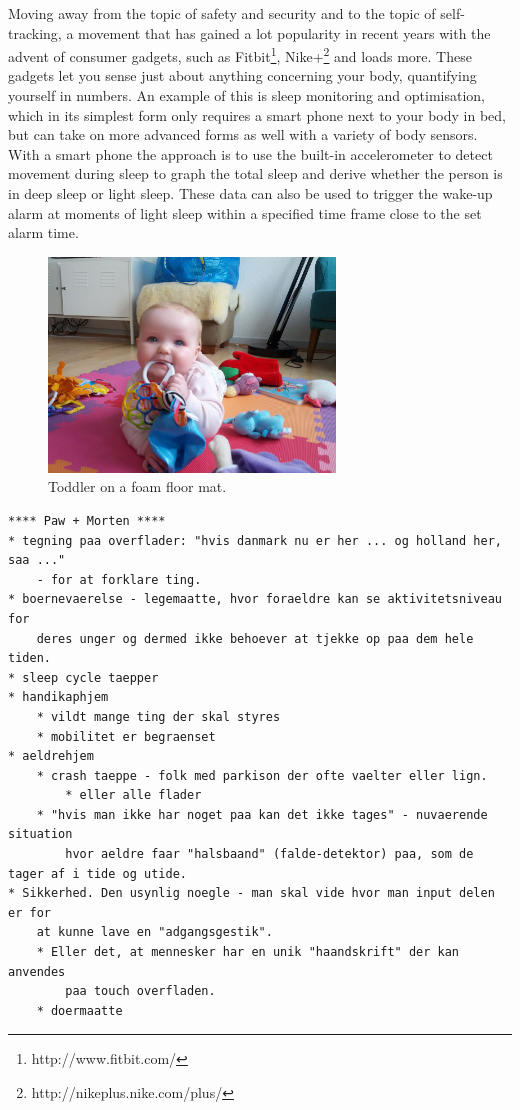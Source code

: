 
Moving away from the topic of safety and security and to the topic of self-tracking, a movement that has gained a lot popularity in recent years with the advent of consumer gadgets, such as Fitbit\footnote{http://www.fitbit.com/}, Nike+\footnote{http://nikeplus.nike.com/plus/} and loads more. 
These gadgets let you sense just about anything concerning your body, quantifying yourself in numbers.
An example of this is sleep monitoring and optimisation, which in its simplest form only requires a smart phone next to your body in bed, but can take on more advanced forms as well with a variety of body sensors.
With a smart phone the approach is to use the built-in accelerometer to detect movement during sleep to graph the total sleep and derive whether the person is in deep sleep or light sleep.
These data can also be used to trigger the wake-up alarm at moments of light sleep within a specified time frame close to the set alarm time.


\begin{figure}[h]
  \centering
      \includegraphics[width=3in]{figures/touch/evaluation/softtiles}
  \caption[Toddler on a foam floor mat with puzzle-like tiles for extensibility.]
  {Toddler on a foam floor mat.}
  \label{fig:textiletouch:eval:softtiles}
\end{figure}

\begin{verbatim}
**** Paw + Morten ****
* tegning paa overflader: "hvis danmark nu er her ... og holland her, saa ..." 
	- for at forklare ting.
* boernevaerelse - legemaatte, hvor foraeldre kan se aktivitetsniveau for 
	deres unger og dermed ikke behoever at tjekke op paa dem hele tiden.
* sleep cycle taepper
* handikaphjem
	* vildt mange ting der skal styres
    * mobilitet er begraenset
* aeldrehjem
    * crash taeppe - folk med parkison der ofte vaelter eller lign.
        * eller alle flader
    * "hvis man ikke har noget paa kan det ikke tages" - nuvaerende situation 
		hvor aeldre faar "halsbaand" (falde-detektor) paa, som de tager af i tide og utide.
* Sikkerhed. Den usynlig noegle - man skal vide hvor man input delen er for 
	at kunne lave en "adgangsgestik".
    * Eller det, at mennesker har en unik "haandskrift" der kan anvendes 
		paa touch overfladen.
    * doermaatte
\end{verbatim}

